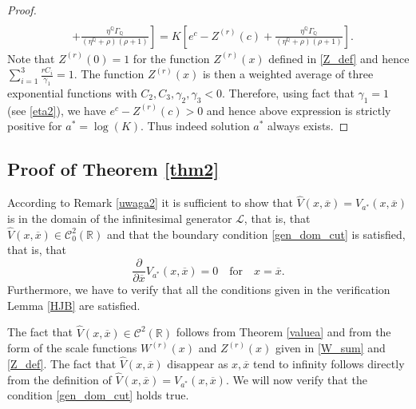 \documentclass[10pt]{amsart}
\def\P{{\mathbb{P}}}
\def\Q{{\mathbb{Q}}}
\def\P{{\mathbb P}} \def\le{\left} \def\ri{\right} \def\i{\infty}
\begin{document}
\begin{proof}
\begin{align*}
				\\ \nonumber &+ \left. \frac{\eta^\Q\Gamma_\Q}{(\eta^\Q+\rho)(\rho+1)} \right] = K\left[ e^c - Z^{(r)}(c) + \frac{\eta^\Q\Gamma_\Q}{(\eta^\Q+\rho)(\rho+1)} \right].
			\end{align*}
			Note that $Z^{(r)}(0) = 1$ for the function $Z^{(r)}(x)$ defined in \eqref{Z_def} and hence
			$\sum_{i=1}^{3} \frac{rC_i}{\gamma_1} = 1$. The function $Z^{(r)}(x)$ is then a weighted average of three exponential functions with $C_2, C_3, \gamma_2, \gamma_3 < 0$. Therefore, using fact that $\gamma_1=1$ (see \eqref{eta2}),
			we have $ e^c - Z^{(r)}(c) > 0$ and hence above expression is strictly positive for $a^* = \log(K)$. Thus indeed solution $a^*$ always exists.
		\end{proof}
		
		\subsection{Proof of Theorem \ref{thm2}}
		According to Remark \ref{uwaga2} it is sufficient to show that $\hat{V}(x, \overline{x})=V_{a^*}(x, \overline{x})$ is in the domain of the infinitesimal generator
		$\mathcal{L}$, that is, that $\hat{V}(x, \overline{x})\in \mathcal{C}^2_0(\mathbb{R})$ and that the boundary condition
		\eqref{gen_dom_cut} is satisfied, that is, that
		\[\frac{\partial}{\partial \overline{x}} V_{a^*}(x, \overline{x})=0\quad \text{for}\quad  x = \overline{x}.\]
		Furthermore, we have to verify that all the conditions given in the verification Lemma \ref{HJB} are satisfied.
		
		The fact that $\hat{V}(x, \overline{x})\in \mathcal{C}^2(\mathbb{R})$ follows from Theorem \ref{valuea} and from the form of the scale functions $W^{(r)}(x)$ and $Z^{(r)}(x)$ given
		in \eqref{W_sum} and \eqref{Z_def}. %
		The fact that $\hat{V}(x, \overline{x})$ disappear as $x, \overline{x}$ tend to infinity follows directly from the definition of
		$\hat{V}(x, \overline{x})=V_{a^*}(x, \overline{x})$.
		We will now verify that the condition \eqref{gen_dom_cut} holds true.
		
\end{document}
